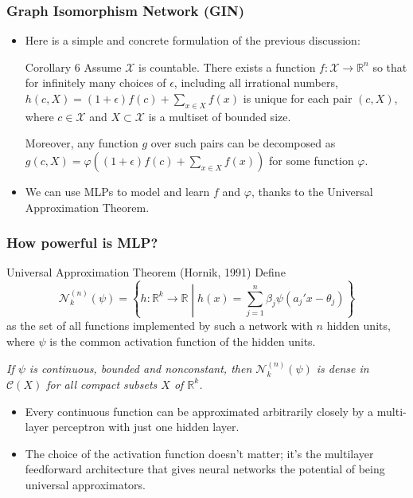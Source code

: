 \documentclass[handout]{beamer}
\begin{document}
\begin{frame}
\frametitle{Graph Isomorphism Network (GIN)}

\begin{itemize}

	\item Here is a simple and concrete formulation of the previous discussion:
	
\begin{block}{Corollary 6}
Assume $\mathcal{X}$ is countable.
There exists a function $f : \mathcal{X} \rightarrow \mathbb{R}^n$ so that for infinitely many choices of $\epsilon$, including all irrational numbers, $h(c, X) = (1 + \epsilon) f(c) + \sum_{x \in X} f(x)$ is unique for each pair $(c, X)$, where $c \in \mathcal{X}$ and $X \subset \mathcal{X}$ is a multiset of bounded size.

Moreover, any function $g$ over such pairs can be decomposed as $g(c, X) = \varphi \left( (1 + \epsilon) f(c) + \sum_{x \in X} f(x) \right)$ for some function $\varphi$.
\end{block} \pause

	\item We can use MLPs to model and learn $f$ and $\varphi$, thanks to the Universal Approximation Theorem.
\end{itemize}

\end{frame}

\begin{frame}
\frametitle{How powerful is MLP?}

\begin{block}{Universal Approximation Theorem (Hornik, 1991)}
Define
$$\mathscr{N}_k^{(n)} (\psi) = \left\{ h : \mathbb{R}^k \rightarrow \mathbb{R} \middle| h(x) = \sum_{j = 1}^n \beta_j \psi(a_j' x - \theta_j) \right\}$$
as the set of all functions implemented by such a network with $n$ hidden units, where $\psi$ is the common activation function of the hidden units.

{\it If $\psi$ is continuous, bounded and nonconstant, then $\mathscr{N}_k^{(n)} (\psi)$ is dense in $\mathscr{C}(X)$ for all compact subsets $X$ of $\mathbb{R}^k$.}
\end{block} \pause

\begin{itemize}
	\item Every continuous function can be approximated arbitrarily closely by a multi-layer perceptron with just one hidden layer. \pause
	
	\item The choice of the activation function doesn't matter; it's the multilayer feedforward architecture that gives neural networks the potential of being universal approximators.
\end{itemize}

\end{frame}
\end{document}
